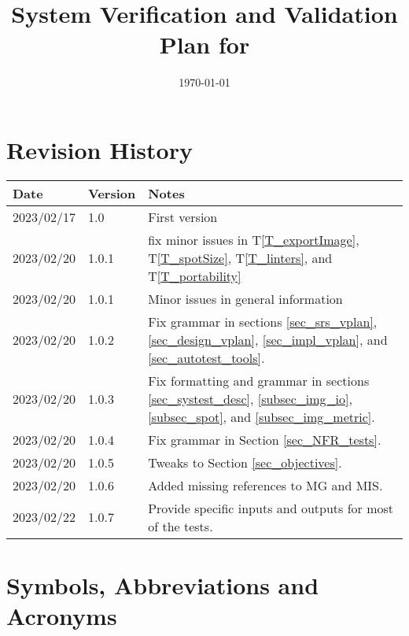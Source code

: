 \documentclass[12pt, titlepage]{article}
\begin{document}
\title{System Verification and Validation Plan for \progname{}} 
\author{\authname}
\date{\today}
	
\maketitle


\section{Revision History}

\begin{tabularx}{\textwidth}{p{2.2cm}p{1.8cm}X}
\toprule {\bf Date} & {\bf Version} & {\bf Notes}\\
\midrule
2023/02/17 & 1.0 & First version \\
2023/02/20 & 1.0.1 & fix minor issues in T\ref{T_exportImage}, T\ref{T_spotSize}, T\ref{T_linters}, 
  and T\ref{T_portability}\\
2023/02/20 & 1.0.1 & Minor issues in general information\\
2023/02/20 & 1.0.2 & Fix grammar in sections \ref{sec_srs_vplan}, 
  \ref{sec_design_vplan}, \ref{sec_impl_vplan}, and \ref{sec_autotest_tools}. \\
2023/02/20 & 1.0.3 & Fix formatting and grammar in sections \ref{sec_systest_desc}, 
  \ref{subsec_img_io}, \ref{subsec_spot}, and \ref{subsec_img_metric}. \\
2023/02/20 & 1.0.4 & Fix grammar in Section \ref{sec_NFR_tests}. \\
2023/02/20 & 1.0.5 & Tweaks to Section \ref{sec_objectives}. \\
2023/02/20 & 1.0.6 & Added missing references to MG and MIS. \\
2023/02/22 & 1.0.7 & Provide specific inputs and outputs for most of the tests. \\
\bottomrule
\end{tabularx}

\newpage

\tableofcontents

\listoftables

\newpage

\section{Symbols, Abbreviations and Acronyms}
\end{document}
